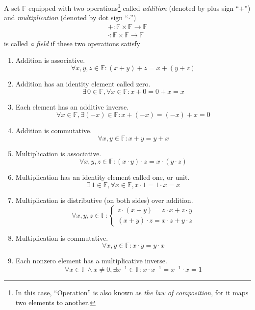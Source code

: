 \begin{definition}
    A set $\mathbb{F}$ equipped with two operations\footnote{In this case, ``Operation'' is also known as \textit{the law of composition}, for it maps two elements to another.} called \textit{addition} (denoted by plus sign ``$+$'') and \textit{multiplication} (denoted by dot sign ``$\cdot$'')
    \[
        \begin{split}
            +: \mathbb{F}\times\mathbb{F}\to\mathbb{F} \\
            \cdot: \mathbb{F}\times\mathbb{F}\to\mathbb{F}
        \end{split}
    \]
    is called \textit{a field} if these two operations satisfy
    \begin{enumerate}[label = (\arabic*)]
        \item Addition is associative.
            \[
               \forall x, y, z\in\mathbb{F}: (x + y) + z = x + (y + z)
            \]
        \item Addition has an identity element called zero.
            \[
                \exists\,0\in\mathbb{F}, \forall x\in\mathbb{F}: x + 0 = 0 + x = x
            \]
        \item Each element has an additive inverse.
            \[
                \forall x\in\mathbb{F}, \exists (-x)\in\mathbb{F}: x + (-x) = (-x) + x = 0
            \]
        \item Addition is commutative.
            \[
                \forall x,y\in\mathbb{F}: x + y = y + x
            \]
        \item Multiplication is associative.
            \[
                \forall x, y, z\in\mathbb{F}: (x\cdot y)\cdot z = x\cdot (y\cdot z)
            \]
        \item Multiplication has an identity element called one, or unit.
            \[
                \exists\,1\in\mathbb{F}, \forall x\in\mathbb{F}, x\cdot 1 = 1\cdot x = x
            \]
        \item Multiplication is distributive (on both sides) over addition.
            \[
                \forall x, y, z\in\mathbb{F}:
                \begin{cases}
                    z\cdot (x + y) = z\cdot x + z\cdot y \\
                    (x + y)\cdot z = x\cdot z + y\cdot z
                \end{cases}
            \]
        \item Multiplication is commutative.
            \[
                \forall x, y\in\mathbb{F}: x\cdot y = y\cdot x
            \]
        \item Each nonzero element has a multiplicative inverse.
            \[
                \forall x\in\mathbb{F} \wedge x\ne 0, \exists x^{-1}\in\mathbb{F}: x\cdot x^{-1} = x^{-1}\cdot x = 1
            \]
    \end{enumerate}
\end{definition}

